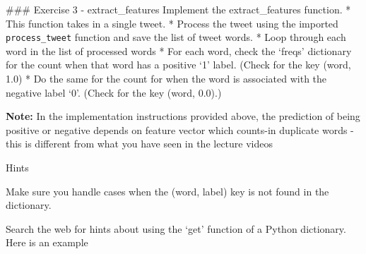 \documentclass[11pt]{article}
\begin{document}
\#\#\# Exercise 3 - extract\_features Implement the extract\_features
function. * This function takes in a single tweet. * Process the tweet
using the imported \texttt{process\_tweet} function and save the list of
tweet words. * Loop through each word in the list of processed words *
For each word, check the `freqs' dictionary for the count when that word
has a positive `1' label. (Check for the key (word, 1.0) * Do the same
for the count for when the word is associated with the negative label
`0'. (Check for the key (word, 0.0).)

\textbf{Note:} In the implementation instructions provided above, the
prediction of being positive or negative depends on feature vector which
counts-in duplicate words - this is different from what you have seen in
the lecture videos

    Hints

Make sure you handle cases when the (word, label) key is not found in
the dictionary.

Search the web for hints about using the `get' function of a Python
dictionary. Here is an example
\end{document}
